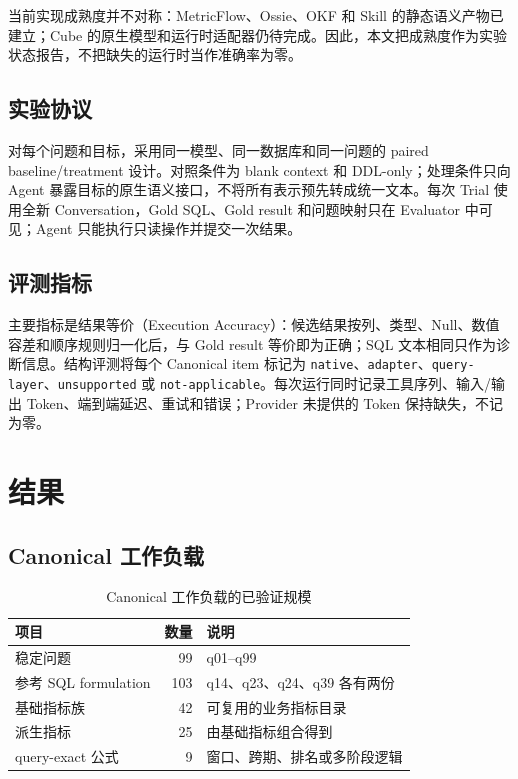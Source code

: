 \documentclass[UTF8,a4paper,12pt]{ctexart}
\newcommand{\code}[1]{\texttt{#1}}
\begin{document}
当前实现成熟度并不对称：MetricFlow、Ossie、OKF 和 Skill 的静态语义产物已建立；Cube 的原生模型和运行时适配器仍待完成。因此，本文把成熟度作为实验状态报告，不把缺失的运行时当作准确率为零。

\subsection{实验协议}

对每个问题和目标，采用同一模型、同一数据库和同一问题的 paired baseline/treatment 设计。对照条件为 blank context 和 DDL-only；处理条件只向 Agent 暴露目标的原生语义接口，不将所有表示预先转成统一文本。每次 Trial 使用全新 Conversation，Gold SQL、Gold result 和问题映射只在 Evaluator 中可见；Agent 只能执行只读操作并提交一次结果。

\subsection{评测指标}

主要指标是结果等价（Execution Accuracy）：候选结果按列、类型、Null、数值容差和顺序规则归一化后，与 Gold result 等价即为正确；SQL 文本相同只作为诊断信息。结构评测将每个 Canonical item 标记为 \code{native}、\code{adapter}、\code{query-layer}、\code{unsupported} 或 \code{not-applicable}。每次运行同时记录工具序列、输入/输出 Token、端到端延迟、重试和错误；Provider 未提供的 Token 保持缺失，不记为零。

\section{结果}

\subsection{Canonical 工作负载}

\begin{table}[ht]
\centering
\caption{Canonical 工作负载的已验证规模}
\label{tab:canonical}
\small
\begin{tabularx}{\linewidth}{p{4.4cm}rY}
\toprule
\textbf{项目} & \textbf{数量} & \textbf{说明}\\
\midrule
稳定问题 & 99 & q01--q99\\
参考 SQL formulation & 103 & q14、q23、q24、q39 各有两份\\
基础指标族 & 42 & 可复用的业务指标目录\\
派生指标 & 25 & 由基础指标组合得到\\
query-exact 公式 & 9 & 窗口、跨期、排名或多阶段逻辑\\
\bottomrule
\end{tabularx}
\end{table}
\end{document}
